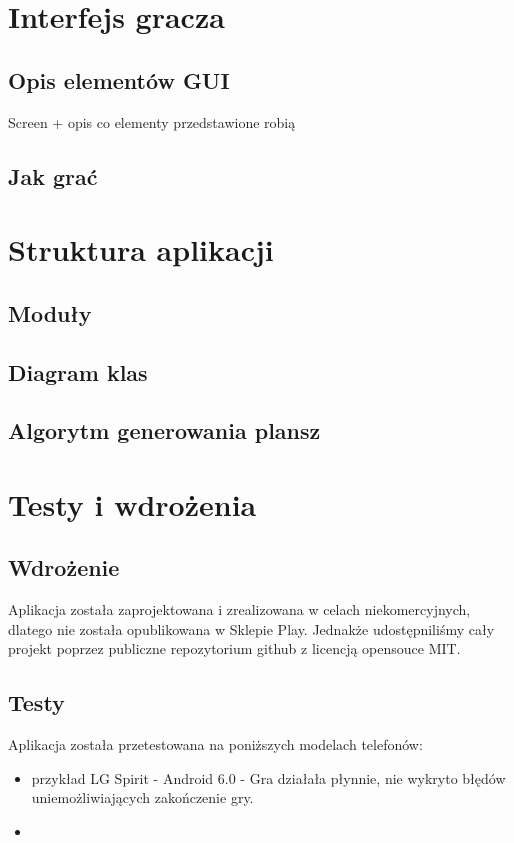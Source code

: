\documentclass[a4paper, 11pt]{article}
\begin{document}
\section{Interfejs gracza}
\subsection{Opis elementów GUI}
Screen + opis co elementy przedstawione robią
\subsection{Jak grać}



\vfill
	\newpage
\section{Struktura aplikacji}
\subsection{Moduły}
\subsection{Diagram klas}
\subsection{Algorytm generowania plansz}

\vfill
\newpage
\section{Testy i wdrożenia}
\subsection{Wdrożenie}
Aplikacja została zaprojektowana i zrealizowana w celach niekomercyjnych, dlatego nie została opublikowana w Sklepie Play. Jednakże udostępniliśmy cały projekt poprzez publiczne repozytorium github z licencją opensouce MIT.
\subsection{Testy}
Aplikacja została przetestowana na poniższych modelach telefonów:
\begin{itemize}
\item przykład LG Spirit - Android 6.0 - Gra działała płynnie, nie wykryto błędów uniemożliwiających zakończenie gry.
\item
\end{itemize}
\end{document}

